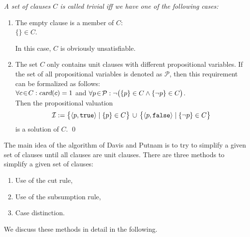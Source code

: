 \begin{Definition}
{\em
  A set of clauses $C$ is called \emph{trivial} iff we have one of the following cases:
  \begin{enumerate}
  \item The empty clause is a member of $C$:
        \\[0.2cm]
        \hspace*{1.3cm}
        $\{\} \in C$.

        In this case,  $C$ is obviously unsatisfiable.
  \item The set $C$ only contains unit clauses with different propositional variables.
        If the set of all propositional variables is denoted as  $\mathcal{P}$,
        then this requirement can be formalized as follows:
        \\[0.3cm]
        \hspace*{1.3cm}
        $\forall c \!\in\! C: \textsl{card}(c) = 1$ \quad and \quad
        $\forall p \!\in\! \mathcal{P}: \neg\bigl( \{p\} \in C \wedge \{\neg p\} \in C\bigr)$.
        \\[0.3cm]
        Then the propositional valuation 
        \[ \I := \bigl\{ \pair(p, \mathtt{true}) \mid \{p\} \in C \bigr\} \,\cup\, \bigl\{
             \pair(p, \mathtt{false}) \mid \{\neg p\} \in C \bigr\} 
        \]
        is a solution of  $C$. \qed
  \end{enumerate}
}
\end{Definition}

The main idea of the algorithm of Davis and Putnam is to try to simplify a given set of
clauses until all clauses are unit clauses.  There are three methods to simplify a given set
of clauses:
\begin{enumerate}
\item Use of the cut rule,
\item Use of the subsumption rule,
\item Case distinction.
\end{enumerate}
We discuss these methods in detail in the following.

